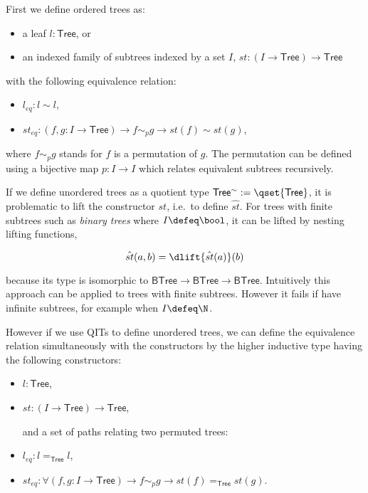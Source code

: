 First we define ordered trees as:
\begin{itemize}
\item a leaf $l: \mathsf{Tree}$, or
\item an indexed family of subtrees indexed by a set $I$, $st : (I \rightarrow \mathsf{Tree}) \rightarrow \mathsf{Tree}$
\end{itemize}
with the following equivalence relation:
\begin{itemize}
\item $l_{eq} : l \sim l$,
\item $st_{eq} : (f , g : I \to \mathsf{Tree}) \to f \sim_{p} g \to st(f) \sim st(g)$,
\end{itemize}
where $f \sim_{p} g$ stands for $f$ is a permutation of $g$. The permutation can be defined using a bijective map $p : I \to I$ which relates equivalent subtrees recursively.


If we define unordered trees as a quotient type $\mathsf{Tree^{\sim}} := \qset{\mathsf{Tree}}$, 
it is problematic to lift the constructor $st$, i.e.\ to define $\hat{st}$.
For trees with finite subtrees such as \emph{binary trees} where $I \defeq \bool$, it can be lifted by nesting lifting functions,

$$\hat{st}(a,b) = \dlift{\hat{st}(a)}(b)$$

because its type is isomorphic to $\mathsf{BTree} \rightarrow \mathsf{BTree} \rightarrow \mathsf{BTree}$.
Intuitively this approach can be applied to trees with finite subtrees. However it fails if have infinite subtrees, for example when $I \defeq \N$.

However if we use QITs to define unordered trees, we can define the
equivalence relation simultaneously with the constructors by the
higher inductive type having the following constructors:

\begin{itemize}
\item $l: \mathsf{Tree}$, 
\item $st : (I \rightarrow \mathsf{Tree}) \rightarrow \mathsf{Tree}$,

and a set of paths relating two permuted trees:

\item $l_{eq} : l  =_{\mathsf{Tree}} l$,

\item$st_{eq} : \forall (f, g : I \to \mathsf{Tree}) \rightarrow  f \sim_{p} g \rightarrow  st(f) =_{\mathsf{Tree}} st(g)$.
\end{itemize}

